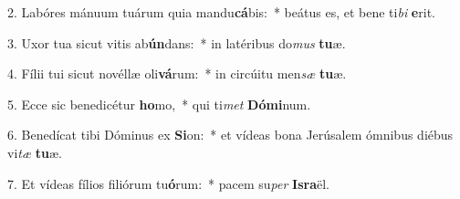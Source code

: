 2. Labóres mánuum tuárum quia mandu\textbf{cá}bis:~*  beátus es, et bene ti\textit{bi} \textbf{e}rit.\

3. Uxor tua sicut vitis ab\textbf{ún}dans:~*  in latéribus do\textit{mus} \textbf{tu}æ.\

4. Fílii tui sicut novéllæ oli\textbf{vá}rum:~*  in circúitu men\textit{sæ} \textbf{tu}æ.\

5. Ecce sic benedicétur \textbf{ho}mo,~*  qui ti\textit{met} \textbf{Dó}\textbf{mi}num.\

6. Benedícat tibi Dóminus ex \textbf{Si}on:~*  et vídeas bona Jerúsalem ómnibus diébus vi\textit{tæ} \textbf{tu}æ.\

7. Et vídeas fílios filiórum tu\textbf{ó}rum:~*  pacem su\textit{per} \textbf{Is}\textbf{ra}ël.\

